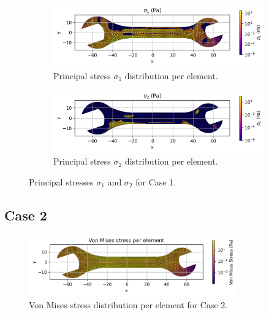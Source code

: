 \begin{figure}[H]
    \centering
    \begin{subfigure}[t]{0.49\textwidth}
      \centering
      \includegraphics[width=\textwidth]{GRAFICOS/Case b - sigma_1_per_element.png}
      \caption{Principal stress $\sigma_1$ distribution per element.}
      \label{fig:sigma_1_b}
    \end{subfigure}
    \hfill
    \begin{subfigure}[t]{0.49\textwidth}
      \centering
      \includegraphics[width=\textwidth]{GRAFICOS/Case b - sigma_2_per_element.png}
      \caption{Principal stress $\sigma_2$ distribution per element.}
      \label{fig:sigma_2_b}
    \end{subfigure}
    \caption{Principal stresses $\sigma_1$ and $\sigma_2$ for Case 1.}
    \label{fig:principal_stresses_b}

\end{figure}

\subsection{Case 2}


\begin{figure}[H]
    \centering
    \includegraphics[width=0.8\textwidth]{GRAFICOS/Case a_von_mises_per_element.png}
    \caption{Von Mises stress distribution per element for Case 2.}
    \label{fig:von_mises_a}
\end{figure}

